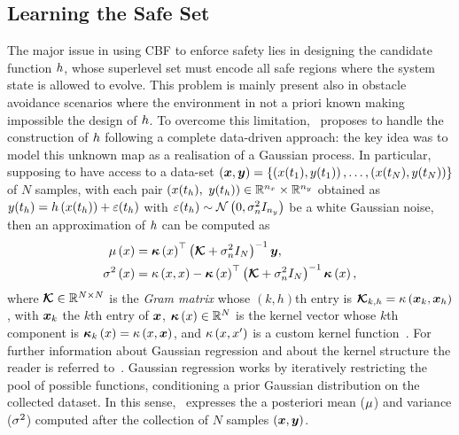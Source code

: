 \subsection{Learning the Safe Set}%
\label{SEC:LEARNING-SAFE-SET}
The major issue in using CBF to enforce safety lies in designing the candidate function $h$, whose superlevel set
must encode all safe regions where the system state is allowed to evolve.
This problem is mainly present also in obstacle avoidance scenarios where the environment in not a priori known
making impossible the design of $h$. To overcome this limitation,~\cite{khan2022gaussian} proposes to handle
the construction of $h$ following a complete data-driven approach: the key idea was to model this unknown map
as a realisation of a Gaussian process. In particular, supposing to have access to a data-set
$\left( \boldsymbol{x}, \boldsymbol{y} \right) = \{ \left( x(t_1), y(t_1) \right), \dots, \left( x(t_{N}), y(t_{N}) \right) \}$
of $N$ samples, with each pair $(x(t_h),$ $ y(t_h)) \in \mathbb{R}^{n_{x}} \times \mathbb{R}^{n_{y}}$ obtained as
$y(t_h) = h \left( x(t_h) \right) + \varepsilon(t_h)$ with $\varepsilon(t_h) \sim \mathcal{N} \left( 0, \sigma_n^2 I_{n_{y}}\right)$
be a white Gaussian noise, then an approximation of $h$ can be computed as
\begin{equation}%
   \label{EQ:CBF-GAUSSIAN-REGRESSION}
   \begin{split}
      \pmu \lp \xx \rp & = \kv \lp \xx \rp\T \lp\km + \nn I_{N}\rp^{-1}\bs{\yy}, \\
      \pvar \lp \xx \rp & = \kf \lp \xx, \xx \rp - \kv \lp \xx \rp \T \lp\km + \nn I_{N}\rp^{-1}\kv \lp \xx \rp,
   \end{split}
\end{equation}
where $\boldsymbol{\mathcal{K}} \in \mathbb{R}^{N \times N}$ is the \textit{Gram matrix} whose $(k,h)$th entry is $\boldsymbol{\mathcal{K}}_{k,h} = \kappa \left( \boldsymbol{x}_k, \boldsymbol{x}_h \right)$,
with $\boldsymbol{x}_k$ the $k$th entry of $\boldsymbol{x}$, $\boldsymbol{\kappa} \left( x \right) \in \mathbb{R}^{N}$ is the kernel vector whose $k$th component is
$\boldsymbol{\kappa}_k \left( x \right) = \kappa \left( x, \boldsymbol{x} \right)$, and $\kappa \left( x, x' \right)$ is a custom kernel function~\cite{rasmussen2003gaussian}.
For further information about Gaussian regression and about the kernel structure the reader is referred to~.
Gaussian regression works by iteratively restricting the pool of possible functions, conditioning a prior Gaussian distribution on the
collected dataset. In this sense,~ expresses the a posteriori mean ($\mu$) and variance ($\sigma^2$)
computed after the collection of $N$ samples $\left( \boldsymbol{x}, \boldsymbol{y} \right)$.

